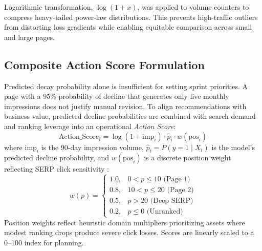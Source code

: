 \documentclass[conference]{IEEEtran}
\begin{document}
Logarithmic transformation, $\log(1 + x)$, was applied to volume counters to compress heavy-tailed power-law distributions. This prevents high-traffic outliers from distorting loss gradients while enabling equitable comparison across small and large pages.

\subsection{Composite Action Score Formulation}
Predicted decay probability alone is insufficient for setting sprint priorities. A page with a 95\% probability of decline that generates only five monthly impressions does not justify manual revision. To align recommendations with business value, predicted decline probabilities are combined with search demand and ranking leverage into an operational \textit{Action Score}:
\begin{equation}
\text{Action\_Score}_i = \log(1 + \text{imp}_i) \cdot \hat{p}_i \cdot w(\text{pos}_i)
\end{equation}
where $\text{imp}_i$ is the 90-day impression volume, $\hat{p}_i = P(y=1 \mid X_i)$ is the model's predicted decline probability, and $w(\text{pos}_i)$ is a discrete position weight reflecting SERP click sensitivity \cite{radlinski2010comparing, craswell2008experimental}:
\begin{equation}
w(p) = \begin{cases}
1.0, & 0 < p \le 10 \text{ (Page 1)} \\
0.8, & 10 < p \le 20 \text{ (Page 2)} \\
0.5, & p > 20 \text{ (Deep SERP)} \\
0.2, & p \le 0 \text{ (Unranked)}
\end{cases}
\end{equation}
Position weights reflect heuristic domain multipliers prioritizing assets where modest ranking drops produce severe click losses. Scores are linearly scaled to a 0--100 index for planning.
\end{document}
